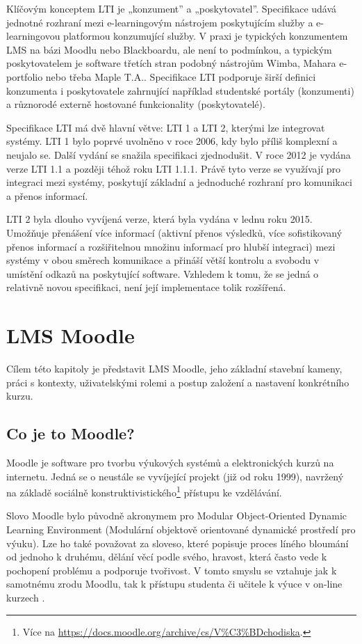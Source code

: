 \documentclass[
print,
  11pt,
  table,   
  nolof,    
  nolot,
  oneside,
  draft
]{fithesis3}
\begin{document}
Klíčovým konceptem LTI je „konzument” a „poskytovatel”. Specifikace udává jednotné rozhraní mezi e-learningovým nástrojem poskytujícím služby a e-learningovou platformou konzumující služby. V praxi je typických konzumentem LMS na bázi Moodlu nebo Blackboardu, ale není to podmínkou, a typickým poskytovatelem je software třetích stran podobný nástrojům Wimba, Mahara e-portfolio nebo třeba Maple T.A.. Specifikace LTI podporuje širší definici konzumenta i poskytovatele zahrnující například studentské portály (konzumenti) a různorodé externě hostované funkcionality (poskytovatelé). \cite{imsltiinvest}


Specifikace LTI má dvě hlavní větve: LTI 1 a LTI 2, kterými lze integrovat systémy. LTI 1 bylo poprvé uvolněno v roce 2006, kdy bylo příliš komplexní a neujalo se. Další vydání se snažila specifikaci zjednodušit. V roce 2012 je vydána verze LTI 1.1 a později téhož roku LTI 1.1.1. Právě tyto verze se využívají pro integraci mezi systémy, poskytují základní a jednoduché rozhraní pro komunikaci a přenos informací.

LTI 2 byla dlouho vyvíjená verze, která byla vydána v lednu roku 2015. Umožňuje přenášení více informací (aktivní přenos výsledků, více sofistikovaný přenos informací a rozšiřitelnou množinu informací pro hlubší integraci) mezi systémy v obou směrech komunikace a přináší větší kontrolu a svobodu v umístění odkazů na poskytující software. Vzhledem k tomu, že se jedná o relativně novou specifikaci, není její implementace tolik rozšířená. \cite{imslti20}


\chapter{LMS Moodle}
Cílem této kapitoly je představit LMS Moodle, jeho základní stavební kameny, práci s kontexty, uživatelskými rolemi  a postup založení a nastavení konkrétního kurzu.

	\section{Co je to Moodle?}

Moodle je software pro tvorbu výukových systémů a elektronických kurzů na internetu. Jedná se o neustále se vyvíjející projekt (již od roku 1999), navržený na základě sociálně konstruktivistického\footnote{Více na \url{https://docs.moodle.org/archive/cs/V\%C3\%BDchodiska}.}  přístupu ke vzdělávání.  

Slovo Moodle bylo původně akronymem pro Modular Object-Oriented Dynamic Learning Environment (Modulární objektově orientované dynamické prostředí pro výuku). Lze ho také považovat za sloveso, které popisuje proces líného bloumání od jednoho k druhému, dělání věcí podle svého, hravost, která často vede k pochopení problému a podporuje tvořivost. V tomto smyslu se vztahuje jak k samotnému zrodu Moodlu, tak k přístupu studenta či učitele k výuce v on-line kurzech \cite{moodle-what-is}. 
\end{document}
